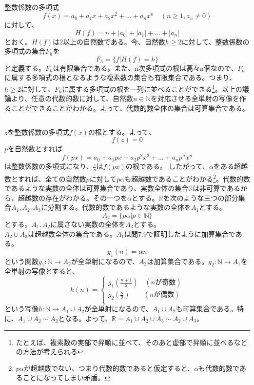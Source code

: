 \documentclass{jsarticle}
\begin{document}
\subsection{}
整数係数の多項式\[f(x)=a_0+a_1x+a_2x^2+\dots+a_nx^n\quad(n\geq 1, a_n\neq0)\]に対して、\[H(f)=n+|a_0|+|a_1|+\dots+|a_n|\]とおく。$H(f)$は2以上の自然数である。今、自然数$h\geq2$に対して、整数係数の多項式の集合$F_h$を
\[F_h=\{f|H(f)=h\}\]
と定義する。$F_h$は有限集合である。また、n次多項式の根は高々n個なので、$F_h$に属する多項式の根となるような複素数の集合も有限集合である。つまり、$h\geq 2$に対して、$F_h$に属する多項式の根を一列に並べることができる\footnote{たとえば、複素数の実部で昇順に並べて、そのあと虚部で昇順に並べるなどの方法が考えられる}。以上の議論より、任意の代数的数に対して、自然数$n\in\mathbb{N}$を対応させる全単射の写像を作ることができることがわかる。よって、代数的数全体の集合は可算集合である。


\subsection{}
$z$を整数係数の多項式$f(x)$の根とする。よって、
\[f(z)=0\]
$p$を自然数とすれば\[f(px)=a_0+a_1px+a_2p^2x^2+\dots+a_np^nx^n\]は整数係数の多項式になり、$\frac{z}{p}$は$f(px)$の根である。
したがって、$\alpha$をある超越数とすれば、全ての自然数$p$に対して$p\alpha$も超越数であることがわかる\footnote{$p\alpha$が超越数でない、つまり代数的数であると仮定すると、$\alpha$も代数的数であることになってしまい矛盾。}。代数的数であるような実数の全体は可算集合であり、実数全体の集合$\mathbb{R}$は非可算であるから、超越数の存在がわかる。その一つを$\alpha$とする。$\mathbb{R}$を次のような三つの部分集合$A_1,A_2,A_3$に分割する。代数的数であるような実数の全体を$A_1$とする。\[A_2=\{p\alpha|p\in \mathbb{N}\}\]とする。$A_1,A_2$に属さない実数の全体を$A_3$とする。\\
$A_2\cup A_3$は超越数全体の集合である。$A_1$は問7.9で証明したように加算集合である。
\[g_1(n)=\alpha n\]
という関数$g_1:\mathbb{N}\to A_2$が全単射になるので、$A_2$は加算集合である。$g_2:\mathbb{N}\to A_1$を全単射の写像とすると、
\[h(n)=
\begin{cases}
g_1(\frac{n+1}{2})\quad(nが奇数)\\
g_2(\frac{n}{2})\qquad(nが偶数)\\
\end{cases}
\]
という写像$h:\mathbb{N}\to A_1\cup A_2$が全単射になるので、$A_1\cup A_2$も可算集合である。特に、$A_1\cup A_2\sim A_2$となる。よって、$\mathbb{R}=A_1\cup A_2\cup A_3\sim A_2\cup A_3$。
\end{document}
